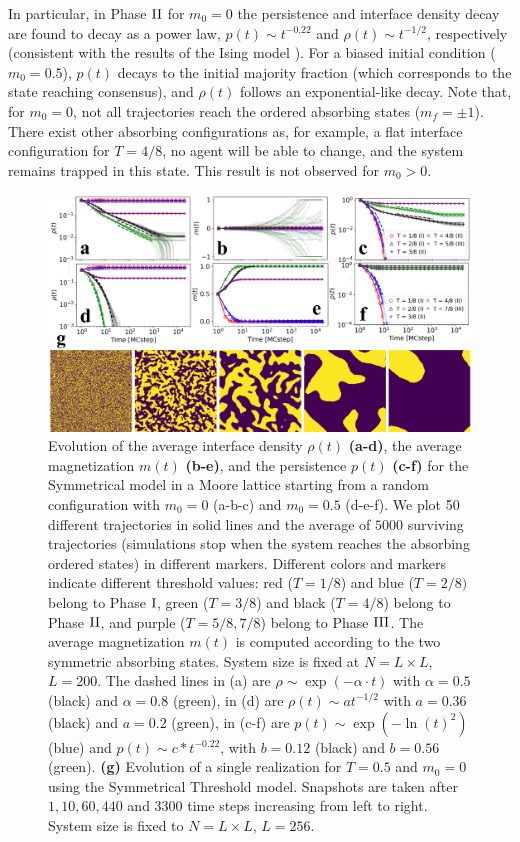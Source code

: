 In particular, in Phase ${\rm II}$ for $m_0 = 0$ the persistence and interface density decay are found to decay as a power law, $p(t) \sim t^{-0.22}$ and $\rho(t) \sim t^{-1/2}$, respectively (consistent with the results of the Ising model \cite{stauffer-1994,derrida-1995A,derrida-1995B,derrida-1997}). For a biased initial condition ($m_0 = 0.5$), $p(t)$ decays to the initial majority fraction (which corresponds to the state reaching consensus), and $\rho(t)$ follows an exponential-like decay. Note that, for $m_0 = 0$, not all trajectories reach the ordered absorbing states ($m_f=\pm 1$). There exist other absorbing configurations as, for example,  a flat interface configuration for $T = 4/8$, no agent will be able to change, and the system remains trapped in this state. This result is not observed for $m_0 > 0$.
\begin{figure}[ht]
		\centering \captionsetup{font=sf}
		\includegraphics[width=\linewidth]{Figs/Aging_STM/FIG10_THESIS.pdf}
		\caption[Dynamical regimes in a Moore lattice.]{\label{fig:evolution_lattice} Evolution of the average interface density $\rho(t)$ \textbf{(a-d)}, the average magnetization $m(t)$ \textbf{(b-e)}, and the persistence $p(t)$ \textbf{(c-f)} for the Symmetrical model in a Moore lattice starting from a random configuration with $m_0 = 0$ (a-b-c) and $m_0 = 0.5$ (d-e-f). We plot 50 different trajectories in solid lines and the average of $5000$ surviving trajectories (simulations stop when the system reaches the absorbing ordered states) in different markers. Different colors and markers indicate different threshold values: red ($T = 1/8$) and blue ($T = 2/8)$ belong to Phase ${\rm I}$, green ($T = 3/8$) and black ($T=4/8$) belong to Phase ${\rm II}$, and purple ($T = 5/8, 7/8$) belong to Phase ${\rm III}$. The average magnetization $m(t)$ is computed according to the two symmetric absorbing states. System size is fixed at $N = L \times L$, $L = 200$. The dashed lines in (a) are $\rho \sim \exp(-\alpha \cdot t)$ with $\alpha = 0.5$ (black) and $\alpha = 0.8$ (green), in (d) are $\rho(t) \sim at^{-1/2}$ with $a = 0.36$ (black) and $a = 0.2$ (green), in (c-f) are $p(t) \sim \exp(- \ln(t)^2)$ (blue) and $p(t) \sim c*t^{-0.22}$, with $b = 0.12$ (black) and $b = 0.56$ (green). \textbf{(g)} Evolution of a single realization for $T = 0.5$ and $m_0 = 0$ using the Symmetrical Threshold model. Snapshots are taken after $1,10,60,440$ and $3300$ time steps increasing from left to right. System size is fixed to $N = L \times L$, $L = 256$.
}
\end{figure}
